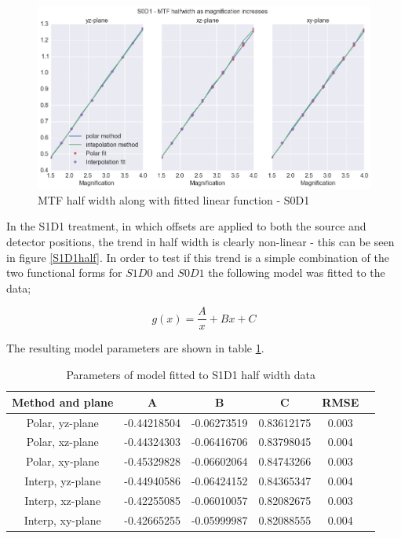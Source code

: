 \documentclass[
  twoside,
  11pt, a4paper,
  footinclude=true,
  headinclude=true,
  cleardoublepage=empty
]{scrbook}
\begin{document}
\begin{figure}[h!]
  \centering
    \includegraphics[width=\textwidth]{code/MTF_and_PSF/MTF_Interp_Polar_Plots_files/MTF_Interp_Polar_Plots_7_0.png}
    \caption{MTF half width along with fitted linear function - S0D1}
        \label{S0D1half}
\end{figure}

In the S1D1 treatment, in which offsets are applied to both the source and detector positions, the trend in half width is clearly non-linear - this can be seen in figure \ref{S1D1half}. In order to test if this trend is a simple combination of the two functional forms for $S1D0$ and $S0D1$ the following model was fitted to the data;

\[
g(x) = \frac{A}{x} + Bx + C
\]

The resulting model parameters are shown in table \ref{explinhalffit}.

\begin{table}
\caption{Parameters of model fitted to S1D1 half width data}
\label{explinhalffit}
\begin{tabular}{c|ccccc}
\toprule
{} Method and plane &     A &     B  & C &  RMSE\\
\midrule
Polar, yz-plane     &    -0.44218504 & -0.06273519 & 0.83612175 & 0.003\\
Polar, xz-plane     &   -0.44324303 & -0.06416706 & 0.83798045  & 0.004\\
Polar, xy-plane     & -0.45329828 & -0.06602064 & 0.84743266  & 0.003\\
Interp, yz-plane     & -0.44940586 & -0.06424152 & 0.84365347  & 0.004\\
Interp, xz-plane     &  -0.42255085 & -0.06010057 & 0.82082675  & 0.003\\
Interp, xy-plane     &  -0.42665255 & -0.05999987 & 0.82088555   & 0.004\\
\bottomrule
\end{tabular}
\end{table}
\end{document}

